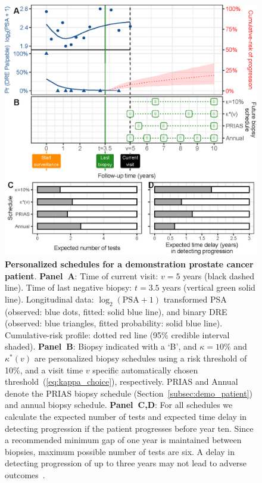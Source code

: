 \documentclass[AMA,STIX1COL]{WileyNJD-v2}
\begin{document}
\begin{figure}[!h]
\centerline{\includegraphics{figure5.eps}}
\caption{\textbf{Personalized schedules for a demonstration prostate cancer patient}. \textbf{Panel~A}: Time of current visit: $v=5$ years (black dashed line). Time of last negative biopsy: $t=3.5$ years (vertical green solid line). Longitudinal data: $\log_2(\mbox{PSA} + 1)$ transformed PSA (observed: blue dots, fitted: solid blue line), and binary DRE (observed: blue triangles, fitted probability: solid blue line). Cumulative-risk profile: dotted red line (95\% credible interval shaded). \textbf{Panel~B}: Biopsy indicated with a `B', and \textbf{$\kappa=10\%$} and \textbf{$\kappa^*(v)$} are personalized biopsy schedules using a risk threshold of 10\%, and a visit time $v$ specific automatically chosen threshold~(\ref{eq:kappa_choice}), respectively. PRIAS and Annual denote the PRIAS biopsy schedule (Section~\ref{subsec:demo_patient}) and annual biopsy schedule. \textbf{Panel~C,D}: For all schedules we calculate the expected number of tests and expected time delay in detecting progression if the patient progresses before year ten. Since a recommended minimum gap of one year is maintained between biopsies, maximum possible number of tests are six. A delay in detecting progression of up to three years may not lead to adverse outcomes~\citep{carvalho}.}
\label{fig:figure5}
\end{figure}
\end{document}
